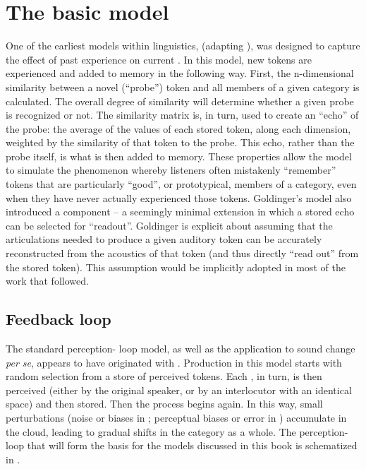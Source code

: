 \chapter{The basic model}\label{ch:The-Exemplar-Model}

One of the earliest  models within linguistics, \citet{Goldinger1996}
(adapting \citealt{hintzman1984minerva}), was designed to capture the
effect of past experience on current . In this model, new
tokens are experienced and added to memory in the following way. First,
the n-dimensional similarity between a novel (``probe'') token and all
members of a given category is calculated. The overall degree of
similarity will determine whether a given probe is recognized or not.
The similarity matrix is, in turn, used to create an ``echo'' of the
probe: the average of the values of each stored token, along each
dimension, weighted by the similarity of that token to the probe. This echo, rather
than the probe itself, is what is then added to memory. These properties
allow the model to simulate the phenomenon whereby listeners often
mistakenly ``remember'' tokens that are particularly ``good'', or prototypical,
members of a category, even when they have never actually experienced
those tokens. Goldinger's model also introduced a  component
– a seemingly minimal extension in which a stored echo can be selected
for ``readout''. Goldinger is explicit about assuming that the articulations
needed to produce a given auditory token can be accurately reconstructed
from the acoustics of that token (and thus directly ``read out'' from
the stored  token). This assumption would be implicitly
adopted in most of the work that followed. 

\section{Feedback loop}

The standard perception- loop model, as well as the application
to sound change \emph{per se}, appears to have originated with \citet{Pierrehumbert2000}.
Production in this model starts with random selection from a store
of perceived tokens. Each , in turn, is then perceived (either
by the original speaker, or by an interlocutor with an identical 
space) and then stored. Then the process begins again. In this way,
small perturbations (noise or  biases in ; perceptual
biases or error in ) accumulate in the  cloud, leading
to gradual shifts in the category as a whole. The perception-
loop that will form the basis for the models discussed in this book
is schematized in .

